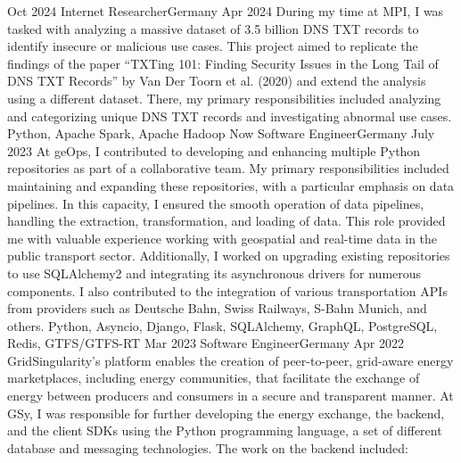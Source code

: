 %
%
%

\begin{experiences}
  \experience
    {Oct 2024} {Internet Researcher}{}{Germany}
    {Apr 2024} {
      During my time at MPI, I was tasked with analyzing a massive dataset of 3.5 billion DNS TXT records to identify insecure or malicious use cases. This project aimed to replicate the findings of the paper “TXTing 101: Finding Security Issues in the Long Tail of DNS TXT Records” by Van Der Toorn et al. (2020) and extend the analysis using a different dataset. There, my primary responsibilities included analyzing and categorizing unique DNS TXT records and investigating abnormal use cases.
    }
    {Python, Apache Spark, Apache Hadoop}
  \emptySeparator
  \experience
    {Now} {Software Engineer}{}{Germany}
    {July 2023} {
      At geOps, I contributed to developing and enhancing multiple Python repositories as part of a collaborative team. My primary responsibilities included maintaining and expanding these repositories, with a particular emphasis on data pipelines. In this capacity, I ensured the smooth operation of data pipelines, handling the extraction, transformation, and loading of data. This role provided me with valuable experience working with geospatial and real-time data in the public transport sector. Additionally, I worked on upgrading existing repositories to use SQLAlchemy2 and integrating its asynchronous drivers for numerous components. I also contributed to the integration of various transportation APIs from providers such as Deutsche Bahn, Swiss Railways, S-Bahn Munich, and others.    
    }
    {Python, Asyncio, Django, Flask, SQLAlchemy, GraphQL, PostgreSQL, Redis, GTFS/GTFS-RT}
  \emptySeparator
  \experience
  {Mar 2023} {Software Engineer}{}{Germany}
  {Apr 2022} {
    GridSingularity’s platform enables the creation of peer-to-peer, grid-aware energy marketplaces, including energy communities, that facilitate the exchange of energy between producers and consumers in a secure and transparent manner. At GSy, I was responsible for further developing the energy exchange, the backend, and the client SDKs using the Python programming language, a set of different database and messaging technologies. The work on the backend included:
}
\end{experiences}
